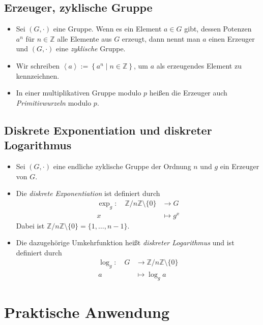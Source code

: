 \documentclass[utf8]{beamer}
\newcommand{\Z}{\mathbb{Z}}
\begin{document}
\subsection{Erzeuger, zyklische Gruppe}
\label{sub:erzeuger_zyklische_gruppe}

\begin{frame}{\insertsubsectionhead}
  \begin{itemize}
    \item Sei $(G, \cdot)$ eine Gruppe. Wenn es ein Element $a \in G$ gibt,
      dessen Potenzen $a^n$ für $n \in \Z$ alle Elemente aus $G$ erzeugt, dann
      nennt man $a$ einen Erzeuger und $(G, \cdot)$ eine \emph{zyklische}
      Gruppe.

    \item Wir schreiben $\left\langle a \right\rangle := \left\{ a^n \mid n \in
      \Z \right\}$, um $a$ als erzeugendes Element zu kennzeichnen.

    \item In einer multiplikativen Gruppe modulo $p$ heißen die Erzeuger auch
      \emph{Primitivwurzeln} modulo $p$.
  \end{itemize}
\end{frame}

\subsection{Diskrete Exponentiation und diskreter Logarithmus}
\label{sub:diskrete_exponentiation}

\begin{frame}{\insertsubsectionhead}
  \begin{itemize}
    \item Sei $(G, \cdot)$ eine endliche zyklische Gruppe der Ordnung $n$ und
      $g$ ein Erzeuger von $G$.
    \item Die \emph{diskrete Exponentiation} ist definiert durch
      \begin{align*}
        \exp_g: \quad \Z/n\Z \setminus \{ 0 \} & \to G\\
        x & \mapsto g^x
      \end{align*}
      Dabei ist $\Z/n\Z \setminus \{ 0 \} = \{1, \dots, n-1\}$.
    \item Die dazugehörige Umkehrfunktion heißt \emph{diskreter Logarithmus} und
      ist definiert durch
      \begin{align*}
        \log_g: \quad G & \to \Z/n\Z \setminus \{ 0 \}\\
        a & \mapsto \log_g a
      \end{align*}
  \end{itemize}
\end{frame}

\section{Praktische Anwendung}
\label{sec:praktische_anwendung}
\end{document}
